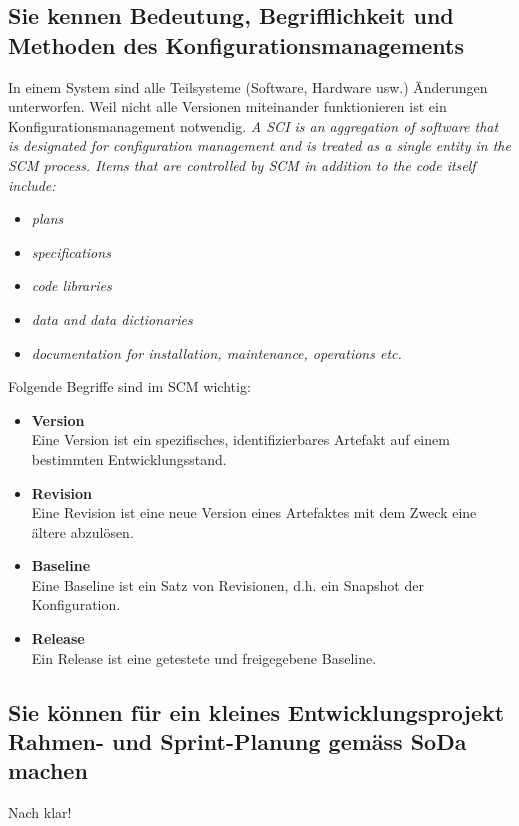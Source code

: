 \subsection{Sie kennen Bedeutung, Begrifflichkeit und Methoden des Konfigurationsmanagements}\label{sec:konfigurationsmanagement}

In einem System sind alle Teilsysteme (Software, Hardware usw.) Änderungen unterworfen. Weil nicht alle Versionen miteinander funktionieren ist ein Konfigurationsmanagement notwendig. \emph{A \ac{SCI} is an aggregation of software that is designated for configuration management and is treated as a single entity in the \ac{SCM} process. Items that are controlled by \ac{SCM} in addition to the code itself include:}

\begin{itemize}
	\item \emph{plans}
	\item \emph{specifications}
	\item \emph{code libraries}
	\item \emph{data and data dictionaries}
	\item \emph{documentation for installation, maintenance, operations etc.}
\end{itemize} 
Folgende Begriffe sind im \ac{SCM} wichtig:
\begin{itemize}
	\item \textbf{Version} \\
		  Eine Version ist ein spezifisches, identifizierbares Artefakt auf einem bestimmten Entwicklungsstand.
	\item \textbf{Revision} \\
		  Eine Revision ist eine neue Version eines Artefaktes mit dem Zweck eine ältere abzulösen.
	\item \textbf{Baseline} \\
		  Eine Baseline ist ein Satz von Revisionen, d.h. ein Snapshot der Konfiguration.
	\item \textbf{Release} \\
		  Ein Release ist eine getestete und freigegebene Baseline.
\end{itemize}

\subsection{Sie können für ein kleines Entwicklungsprojekt Rahmen- und Sprint-Planung gemäss SoDa machen}

Nach klar!

